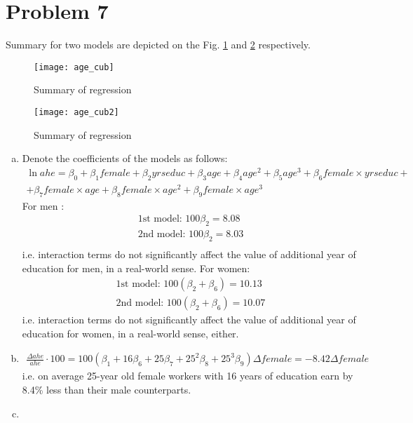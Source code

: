 \documentclass[a4paper]{article}
\begin{document}
\section*{Problem 7}
Summary for two models are depicted on the Fig. \ref{fig2} and \ref{fig3} respectively.

\begin{figure}[H]
	\centering
	\texttt{[image: age\_cub]}
	\caption{Summary of regression}\label{fig2}
\end{figure}
\begin{figure}[H]
	\centering
	\texttt{[image: age\_cub2]}
	\caption{Summary of regression}\label{fig3}
\end{figure}
\begin{enumerate}[a.]
	\item Denote the coefficients of the models as follows:
	\begin{align*}
	\ln ahe = \beta_0 + \beta_1 female + \beta_2 yrseduc + \beta_3 age + \beta_4 age^2 + \beta_5 age^3 + \beta_6 female \times yrseduc + \\
	+\beta_7 female \times age + \beta_8 female \times age^2 + \beta_9 female \times age^3
	\end{align*}
	For men :
	\begin{align*}
	\text{1st model: } 100 \beta_2 = 8.08\\
	\text{2nd model: } 100 \beta_2 = 8.03\\
	\end{align*}
	i.e. interaction terms do not significantly affect the value of additional year of education for men, in a real-world sense.
	For women:
	\begin{align*}
	\text{1st model: } 100(\beta_2 + \beta_6) = 10.13\\
	\text{2nd model: } 100(\beta_2 + \beta_6) = 10.07
	\end{align*}
	i.e. interaction terms do not significantly affect the value of additional year of education for women, in a real-world sense, either.
	\item \begin{align*}
	\frac{\Delta ahe}{ahe} \cdot 100 = 100(\beta_1 + 16 \beta_6 + 25 \beta_7 + 25^2 \beta_8 + 25^3 \beta_9)\Delta female = -8.42 \Delta female
	\end{align*}
	i.e. on average 25-year old female workers with 16 years of education earn by 8.4\% less than their male counterparts.
	\item \begin{align*}

\end{align*}
\end{enumerate}
\end{document}
